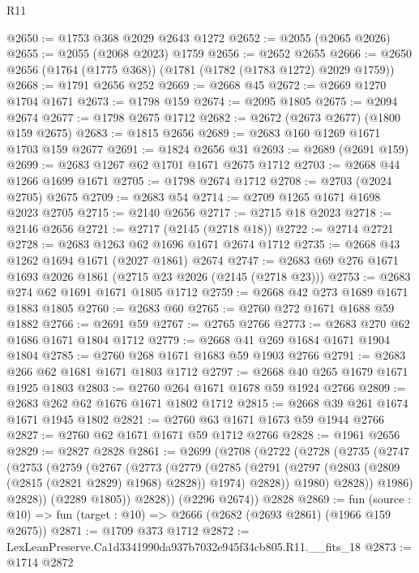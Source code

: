 \begin{lexlean}{R11}
\begin{coremodule}
@2650 := @1753 @368 @2029 @2643 @1272
@2652 := @2055 (@2065 @2026)
@2655 := @2055 (@2068 @2023) @1759
@2656 := @2652 @2655
@2666 := @2650 @2656 (@1764 (@1775 @368)) (@1781 (@1782 (@1783 @1272) @2029 @1759))
@2668 := @1791 @2656 @252
@2669 := @2668 @45
@2672 := @2669 @1270 @1704 @1671
@2673 := @1798 @159
@2674 := @2095 @1805
@2675 := @2094 @2674
@2677 := @1798 @2675 @1712
@2682 := @2672 (@2673 @2677) (@1800 @159 @2675)
@2683 := @1815 @2656
@2689 := @2683 @160 @1269 @1671 @1703 @159 @2677
@2691 := @1824 @2656 @31
@2693 := @2689 (@2691 @159)
@2699 := @2683 @1267 @62 @1701 @1671 @2675 @1712
@2703 := @2668 @44 @1266 @1699 @1671
@2705 := @1798 @2674 @1712
@2708 := @2703 (@2024 @2705) @2675
@2709 := @2683 @54
@2714 := @2709 @1265 @1671 @1698 @2023 @2705
@2715 := @2140 @2656
@2717 := @2715 @18 @2023
@2718 := @2146 @2656
@2721 := @2717 (@2145 (@2718 @18))
@2722 := @2714 @2721
@2728 := @2683 @1263 @62 @1696 @1671 @2674 @1712
@2735 := @2668 @43 @1262 @1694 @1671 (@2027 @1861) @2674
@2747 := @2683 @69 @276 @1671 @1693 @2026 @1861 (@2715 @23 @2026 (@2145 (@2718 @23)))
@2753 := @2683 @274 @62 @1691 @1671 @1805 @1712
@2759 := @2668 @42 @273 @1689 @1671 @1883 @1805
@2760 := @2683 @60
@2765 := @2760 @272 @1671 @1688 @59 @1882
@2766 := @2691 @59
@2767 := @2765 @2766
@2773 := @2683 @270 @62 @1686 @1671 @1804 @1712
@2779 := @2668 @41 @269 @1684 @1671 @1904 @1804
@2785 := @2760 @268 @1671 @1683 @59 @1903 @2766
@2791 := @2683 @266 @62 @1681 @1671 @1803 @1712
@2797 := @2668 @40 @265 @1679 @1671 @1925 @1803
@2803 := @2760 @264 @1671 @1678 @59 @1924 @2766
@2809 := @2683 @262 @62 @1676 @1671 @1802 @1712
@2815 := @2668 @39 @261 @1674 @1671 @1945 @1802
@2821 := @2760 @63 @1671 @1673 @59 @1944 @2766
@2827 := @2760 @62 @1671 @1671 @59 @1712 @2766
@2828 := @1961 @2656
@2829 := @2827 @2828
@2861 := @2699
    (@2708
      (@2722
        (@2728
          (@2735
            (@2747
              (@2753
                (@2759
                  (@2767
                    (@2773
                      (@2779
                        (@2785
                          (@2791
                            (@2797 (@2803 (@2809 (@2815 (@2821 @2829) @1968) @2828)) @1974)
                            @2828))
                        @1980)
                      @2828))
                  @1986)
                @2828))
            (@2289 @1805))
          @2828))
      (@2296 @2674))
    @2828
@2869 := fun (source : @10) => fun (target : @10) => @2666 (@2682 (@2693 @2861) (@1966 @159 @2675))
@2871 := @1709 @373 @1712
@2872 := LexLeanPreserve.Ca1d3341990da937b7032e945f34cb805.R11.__fits_18
@2873 := @1714 @2872

\end{coremodule}
\end{lexlean}
